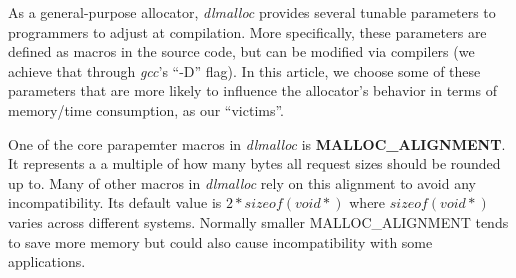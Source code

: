 \begin{table*}[htbp]
\centering
\caption{\emph{dlmalloc} parameters}
\label{tab_dlmalloc_parameters}
\end{table*}

As a general-purpose allocator, \emph{dlmalloc} provides several tunable parameters to programmers to adjust at compilation. More specifically, these parameters are defined as macros in the source code, but can be modified via compilers (we achieve that through \emph{gcc}'s ``-D'' flag). In this article, we choose some of these parameters that are more likely to influence the allocator's behavior in terms of memory/time consumption, as our ``victims''. 

One of the core parapemter macros in \emph{dlmalloc}  is \textbf{MALLOC\_ALIGNMENT}. It represents a a multiple of how many bytes all request sizes should be rounded up to. Many of other macros in \emph{dlmalloc} rely on this alignment to avoid any incompatibility. Its default value is $2*sizeof(void*)$ where $sizeof(void*)$ varies across different systems. Normally smaller MALLOC\_ALIGNMENT tends to save more memory but could also cause incompatibility with some applications. 


